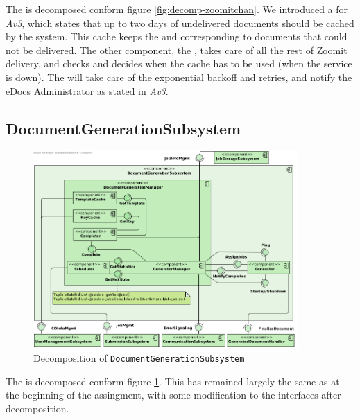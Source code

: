 The  is decomposed conform figure \ref{fig:decomp-zoomitchan}. We introduced a  for \emph{Av3}, which states that up to two days of undelivered documents should be cached by the system. This cache keeps the  and  corresponding to documents that could not be delivered. The other component, the , takes care of all the rest of Zoomit delivery, and checks and decides when the cache has to be used (when the service is down). The  will take care of the exponential backoff and retries, and notify the eDocs Administrator as stated in \emph{Av3}.

\subsection{DocumentGenerationSubsystem}
\begin{figure}[!htp]
    \centering
    \includegraphics[width=0.9\textwidth]{figures/Document Generation Subsystem.png}
    \caption{Decomposition of \texttt{DocumentGenerationSubsystem}}\label{fig:decomp-docgensub}
\end{figure}

The  is decomposed conform figure \ref{fig:decomp-docgensub}. This has remained largely the same as at the beginning of the assingment, with some modification to the interfaces after decomposition.

